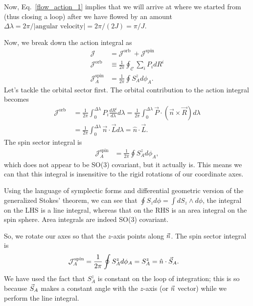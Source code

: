 Now, Eq.~\eqref{flow_action_1} implies that we will
arrive at where we started from (thus closing  a loop) after we have
flowed by an amount $\Delta \lambda = 
2 \pi/|\text{angular~velocity}|  
= 2 \pi/(2 J)   = \pi/J$.


Now, we break down the action integral as
\begin{equation}
\begin{aligned}
\mathcal{J} &=\mathcal{J}^{\text {orb }}+\mathcal{J}^{\text {spin }} \\
\mathcal{J}^{\text {orb }} & \equiv \frac{1}{2 \pi} \oint_{\mathcal{C}} \sum_{i} P_{i} d R^{i}   \\
\mathcal{J}_{A}^{\mathrm{spin}}  & =\frac{1}{2 \pi} \oint S_{A}^{z} d \phi_{A} .
\end{aligned}
\end{equation}
Let's tackle the orbital sector first. The orbital contribution
to the action integral becomes
\begin{align}
\mathcal{J}^{\text {orb }} &=\frac{1}{2 \pi} \int_{0}^{\Delta \lambda} P_{i} \frac{d R^{i}}{d \lambda} d \lambda=\frac{1}{2 \pi} \int_{0}^{\Delta \lambda} \vec{P} \cdot(\vec{n} \times \vec{R}) d \lambda \\
&=\frac{1}{2 \pi} \int_{0}^{\Delta \lambda} \vec{n} \cdot \vec{L} d \lambda=\hat{n} \cdot \vec{L}   .     \label{orbital_contribution}
\end{align}
The spin sector integral is 
\begin{align}
\mathcal{J}_{A}^{\mathrm{spin}}  & =\frac{1}{2 \pi} \oint S_{A}^{z} d \phi_{A},
\end{align}
which does not appear to be SO(3) covariant, but it actually is. 
This means we can that this integral is insensitive to
the rigid rotations of our coordinate axes.


\hfill \break


\begin{definition}[label=def:D]
Using the language of symplectic forms and differential geometric version 
of the generalized Stokes' theorem, we can see that 
$ \oint S_z d \phi =  \int d S_z \wedge d\phi$, the integral on the LHS is a
line integral, whereas that on the RHS is an area integral on the spin
sphere. Area integrals are indeed SO(3) covariant.
\end{definition}

\hfill \break


So, we rotate our axes so that the $z$-axis points along $\vec{n}$.
The spin sector integral is 
\begin{align}
\mathcal{J}_{A}^{\mathrm{spin}}   =\frac{1}{2 \pi} \oint S_{A}^{z} d \phi_{A} 
  & =    S_{A}^{z}   =  \hat{n} \cdot \vec{S}_A.   \label{spin_contribution}
\end{align}
We have used the fact that $S_{A}^{z}$ is constant on the loop of integration;
this is so because $\vec{S}_A$ makes a constant angle with the $z$-axis 
(or $\vec{n}$ vector) while we perform the line integral.



